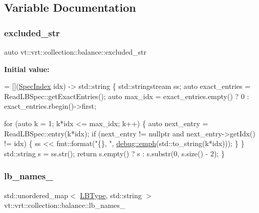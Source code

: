 \subsection{Variable Documentation}
\mbox{\label{namespacevt_1_1vrt_1_1collection_1_1balance_af2f6674ecc7191ddbfe31e87569fe334}} 
\subsubsection{\texorpdfstring{excluded\+\_\+str}{excluded\_str}}
{\footnotesize\ttfamily auto vt\+::vrt\+::collection\+::balance\+::excluded\+\_\+str}

{\bfseries Initial value\+:}
\begin{DoxyCode}
= [](\hyperlink{namespacevt_1_1vrt_1_1collection_1_1balance_a72a5e0d9936ddf57f8e6c64e0e9fd123}{SpecIndex} idx) -> std::string \{
  std::stringstream ss;
  \textcolor{keyword}{auto} exact\_entries = ReadLBSpec::getExactEntries();
  \textcolor{keyword}{auto} max\_idx = exact\_entries.empty() ? 0 : exact\_entries.rbegin()->first;

  \textcolor{keywordflow}{for} (\textcolor{keyword}{auto} k = 1; k*idx <= max\_idx; k++) \{
    \textcolor{keyword}{auto} next\_entry = ReadLBSpec::entry(k*idx);
    \textcolor{keywordflow}{if} (next\_entry != \textcolor{keyword}{nullptr} and next\_entry->getIdx() != idx) \{
      ss << fmt::format(\textcolor{stringliteral}{"\{\}, "}, \hyperlink{namespacevt_1_1debug_add365336d7aa2053b5b7588ccad48ac7}{debug::emph}(std::to\_string(k*idx)));
    \}
  \}
  std::string s = ss.str();
  \textcolor{keywordflow}{return} s.empty() ? s : s.substr(0, s.size() - 2);
\}
\end{DoxyCode}
\mbox{\label{namespacevt_1_1vrt_1_1collection_1_1balance_a25f2d26f8832c24be922ebbb2cd7c119}} 
\subsubsection{\texorpdfstring{lb\+\_\+names\+\_\+}{lb\_names\_}}
{\footnotesize\ttfamily std\+::unordered\+\_\+map$<$ \hyperlink{namespacevt_1_1vrt_1_1collection_1_1balance_ac4f99693509affcc67db182d4aad9b5c}{L\+B\+Type}, std\+::string $>$ vt\+::vrt\+::collection\+::balance\+::lb\+\_\+names\+\_\+}

